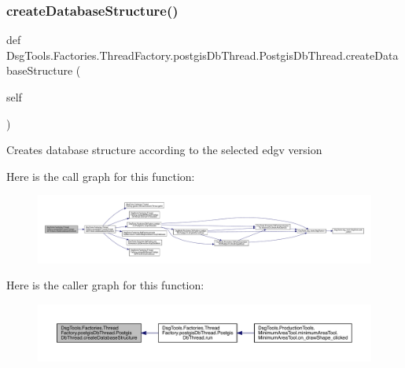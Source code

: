\subsubsection{\texorpdfstring{create\+Database\+Structure()}{createDatabaseStructure()}}
{\footnotesize\ttfamily def Dsg\+Tools.\+Factories.\+Thread\+Factory.\+postgis\+Db\+Thread.\+Postgis\+Db\+Thread.\+create\+Database\+Structure (\begin{DoxyParamCaption}\item[{}]{self }\end{DoxyParamCaption})}

\begin{DoxyVerb}Creates database structure according to the selected edgv version
\end{DoxyVerb}
 Here is the call graph for this function\+:
\nopagebreak
\begin{figure}[H]
\begin{center}
\leavevmode
\includegraphics[width=350pt]{class_dsg_tools_1_1_factories_1_1_thread_factory_1_1postgis_db_thread_1_1_postgis_db_thread_a907e00bab6dfd9aacd2a4157330a6dbf_cgraph}
\end{center}
\end{figure}
Here is the caller graph for this function\+:
\nopagebreak
\begin{figure}[H]
\begin{center}
\leavevmode
\includegraphics[width=350pt]{class_dsg_tools_1_1_factories_1_1_thread_factory_1_1postgis_db_thread_1_1_postgis_db_thread_a907e00bab6dfd9aacd2a4157330a6dbf_icgraph}
\end{center}
\end{figure}
\mbox{\label{class_dsg_tools_1_1_factories_1_1_thread_factory_1_1postgis_db_thread_1_1_postgis_db_thread_a94eafae562bc5ec0dfe616e42575a167}} 
